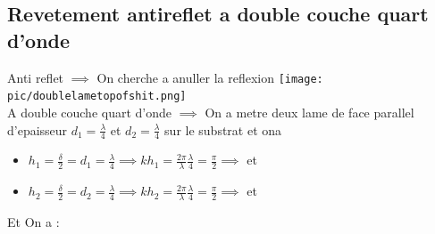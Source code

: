 \documentclass[12pt]{book}
\begin{document}
            \subsection{Revetement antireflet a double couche quart d'onde}
            Anti reflet $\implies$ On cherche a anuller la reflexion  \texttt{[image: pic/doublelametopofshit.png]}\\
            A double couche quart d'onde $\implies$ On a metre deux lame de face parallel d'epaisseur $d_1=\frac{\lambda}{4}$ et $d_2=\frac{\lambda}{4}$ sur le substrat et ona   \\
            \begin{itemize}
                \item $h_1=\frac{\delta}{2}=d_1=\frac{\lambda}{4} \implies kh_1=\frac{2\pi}{\lambda}\frac{\lambda}{4}=\frac{\pi}{2} \implies$ et 
                \item $h_2=\frac{\delta}{2}=d_2=\frac{\lambda}{4} \implies kh_2=\frac{2\pi}{\lambda}\frac{\lambda}{4}=\frac{\pi}{2} \implies$ et 
            \end{itemize}
            Et On a : \\
\end{document}
